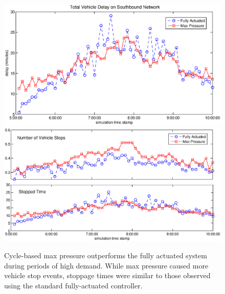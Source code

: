 \begin{figure}[h!]
\vspace{-2em}
\centering
\includegraphics[width=\columnwidth]{./VehicleDelayPlot.eps}\\
\includegraphics[width=\columnwidth]{./VehicleStopsPlot.eps}
\vspace{-2.5em}
\caption{Cycle-based max pressure outperforms the fully actuated system during periods of high demand. While max pressure caused more vehicle stop events, stoppage times were similar to those observed using the standard fully-actuated controller. \label{fig_delaystops}}
\end{figure}

